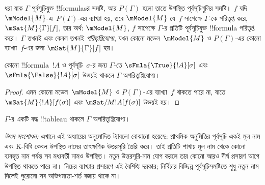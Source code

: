 \documentclass[../../../include/open-logic-section]{subfiles}
\begin{document}
\begin{defn}
  ধরা যাক $\Gamma$ পূর্বসূচিযুক্ত !!{formula}sর সমষ্টি, আর
  $P(\Gamma)$ হলো তাতে উপস্থিত পূর্বসূচিগুলির সমষ্টি। $f$ যদি
  $\mModel{M}$-এ~$P(\Gamma)$-এর ব্যাখ্যা হয়, তবে
  $\mModel{M}$ যে~$f$ সাপেক্ষে $\Gamma$-কে পরিতৃপ্ত করে,
  $\mSat{M}{\Gamma}[f]$, তার অর্থ: $\mModel{M}$, $f$ সাপেক্ষে
  $\Gamma$-র প্রতিটি পূর্বসূচিযুক্ত !!{formula} পরিতৃপ্ত করে।
  $\Gamma$ তখনই এবং কেবল তখনই \emph{পরিতৃপ্তিযোগ্য}, যখন
  কোনো মডেল~$\mModel{M}$ ও $P(\Gamma)$-এর কোনো ব্যাখ্যা~$f$-এর জন্য
  $\mSat{M}{\Gamma}[f]$ হয়।
\end{defn}

\begin{prop}
  কোনো !!{formula}~$!A$ ও পূর্বসূচি~$\sigma$-র জন্য
  $\Gamma$-তে $\sFmla{\True}{!A}[\sigma]$ এবং
  $\sFmla{\False}{!A}[\sigma]$ উভয়ই থাকলে
  $\Gamma$ অপরিতৃপ্তিযোগ্য।
\end{prop}

\begin{proof}
  এমন কোনো মডেল~$\mModel{M}$ ও $P(\Gamma)$-এর ব্যাখ্যা~$f$
  থাকতে পারে না, যাতে $\mSat{M}{!A}[f(\sigma)]$ এবং
  $\mSat/{M}{!A}[f(\sigma)]$ উভয়ই হয়।
\end{proof}

\begin{thm}[বিশুদ্ধতা]
  $\Gamma$-র একটি বদ্ধ !!{tableau} থাকলে $\Gamma$ অপরিতৃপ্তিযোগ্য।
\end{thm}
\emph{উৎস-সংশোধন:} এখানে এই অধ্যায়ের অনুমোদিত ট্যাবলো বোঝানো হয়েছে: প্রাথমিক অনুমিতির পূর্বসূচি একই মূল নাম এবং K-বিধি কেবল উপস্থিত নামের তাৎক্ষণিক উত্তরসূরি তৈরি করে। তাই প্রতিটি শাখায় মূল নাম থেকে কোনো ব্যবহৃত নাম পর্যন্ত সব মধ্যবর্তী নামও উপস্থিত। নতুন উত্তরসূরি-নাম যোগ করলে তার কোনো আরও দীর্ঘ প্রসারণ আগে উপস্থিত থাকতে পারে না। নিচের ব্যাখ্যার প্রসারণে এই বৈশিষ্ট্য দরকার; নির্বিচার বিচ্ছিন্ন পূর্বসূচিসমষ্টিতে শুধু নতুন নাম দিলেই পুরোনো সব অভিগম্যতা-শর্ত বজায় থাকে না।
\end{document}
